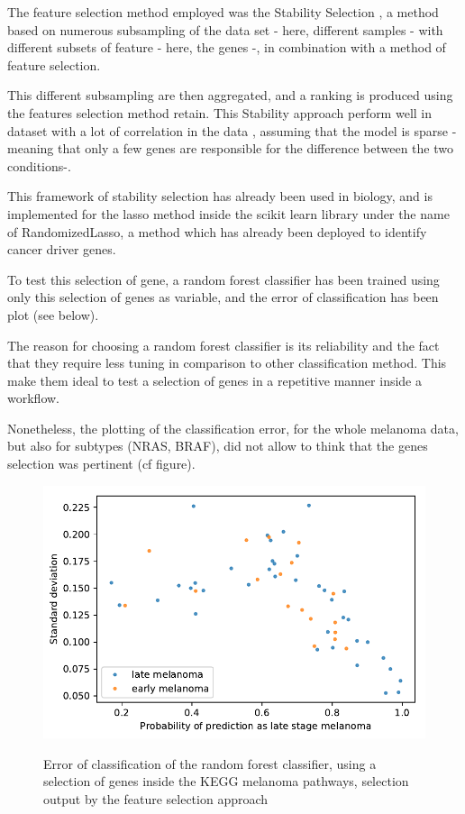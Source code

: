 \documentclass[a4paper,12pt]{report}
\begin{document}
The feature selection method employed was the Stability Selection \cite{stability}, a method based on numerous subsampling of the data set - here, different samples - with different subsets of feature - here, the genes -, in combination with a method of feature selection.

This different subsampling are then aggregated, and a ranking is produced using the features selection method retain. This Stability approach perform well in dataset with a lot of correlation in the data \cite{stability}, assuming that the model is sparse - meaning that only a few genes are responsible for the difference between the two conditions-.

This framework of stability selection has already been used in biology\cite{tigress}, and is implemented for the lasso method inside the scikit learn library\cite{scikit} under the name of RandomizedLasso, a method which has already been deployed to identify cancer driver genes\cite{randomlasso}.

To test this selection of gene, a random forest classifier \cite{springer} has been trained using only this selection of genes as variable, and the error of classification has been plot (see below).

The reason for choosing a random forest classifier is its reliability and the fact that they require less tuning in comparison to other classification method\cite{springer}. This make them ideal to test a selection of genes in a repetitive manner inside a workflow.

Nonetheless, the plotting of the classification error, for the whole melanoma data, but also for subtypes\cite{TGCA} (NRAS, BRAF), did not allow to think that the genes selection was pertinent (cf figure).

\begin{figure}[H]
	\centering
	{\includegraphics[width=1\textwidth]{forest_prediction}}
	\caption{Error of classification of the random forest classifier, using a selection of genes inside the KEGG melanoma pathways, selection output by the feature selection approach}
\end{figure}
\end{document}
